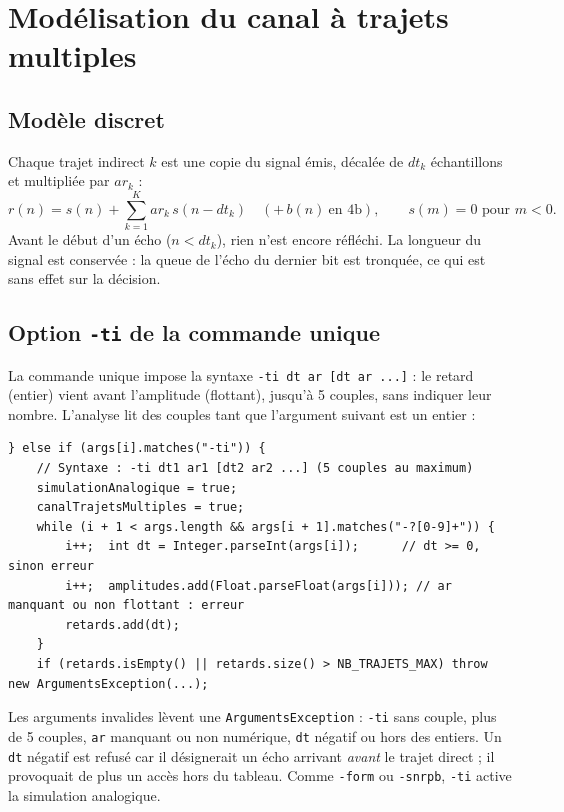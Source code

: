 \documentclass[11pt,a4paper]{article}
\newcommand{\cls}[1]{\texttt{#1}}
\begin{document}
\section{Modélisation du canal à trajets multiples}
\subsection{Modèle discret}
Chaque trajet indirect $k$ est une copie du signal émis, décalée de $dt_k$ échantillons et multipliée par $ar_k$ :
\[ r(n) = s(n) + \sum_{k=1}^{K} ar_k\, s(n - dt_k) \quad (+\,b(n)\ \text{en 4b}), \qquad s(m) = 0 \text{ pour } m < 0. \]
Avant le début d'un écho ($n < dt_k$), rien n'est encore réfléchi. La longueur du signal est conservée : la queue de l'écho du dernier bit est tronquée, ce qui est sans effet sur la décision.

\subsection{Option \texttt{-ti} de la commande unique}
La commande unique impose la syntaxe \texttt{-ti dt ar [dt ar ...]} : le retard (entier) vient avant l'amplitude (flottant), jusqu'à 5 couples, sans indiquer leur nombre. L'analyse lit des couples tant que l'argument suivant est un entier :
\begin{lstlisting}
} else if (args[i].matches("-ti")) {
    // Syntaxe : -ti dt1 ar1 [dt2 ar2 ...] (5 couples au maximum)
    simulationAnalogique = true;
    canalTrajetsMultiples = true;
    while (i + 1 < args.length && args[i + 1].matches("-?[0-9]+")) {
        i++;  int dt = Integer.parseInt(args[i]);      // dt >= 0, sinon erreur
        i++;  amplitudes.add(Float.parseFloat(args[i])); // ar manquant ou non flottant : erreur
        retards.add(dt);
    }
    if (retards.isEmpty() || retards.size() > NB_TRAJETS_MAX) throw new ArgumentsException(...);
\end{lstlisting}
Les arguments invalides lèvent une \cls{ArgumentsException} : \texttt{-ti} sans couple, plus de 5 couples, \texttt{ar} manquant ou non numérique, \texttt{dt} négatif ou hors des entiers. Un \texttt{dt} négatif est refusé car il désignerait un écho arrivant \emph{avant} le trajet direct ; il provoquait de plus un accès hors du tableau. Comme \texttt{-form} ou \texttt{-snrpb}, \texttt{-ti} active la simulation analogique.
\end{document}

